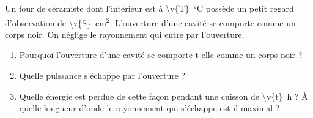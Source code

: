 Un four de céramiste dont l'intérieur est à \qty{\v{T}}{\degreeCelsius} possède un petit regard d'observation de \qty{\v{S}}{cm^2}. L'ouverture d'une cavité se comporte comme un corps noir. On néglige le rayonnement qui entre par l'ouverture.

\begin{enumerate}[label=\alph*)]
    \item Pourquoi l'ouverture d'une cavité se comporte-t-elle comme un corps noir ?
    \item Quelle puissance s'échappe par l'ouverture ?
    \item Quelle énergie est perdue de cette façon pendant une cuisson de \qty{\v{t}}{h} ? À quelle longueur d'onde le rayonnement qui s'échappe est-il maximal ?
\end{enumerate}
